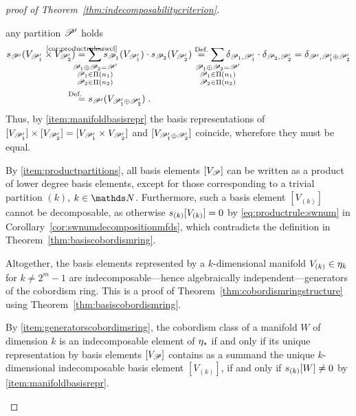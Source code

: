 \begin{proof}[proof of Theorem~\ref{thm:indecomposabilitycriterion}]
\begin{steps}
    any partition $\mathscr{P}'$ holds
    \begin{align*}
      \s{\Part'}(V_{\Part_1'}\times V_{\Part_2'})
      &\cequalsby{\ref{cor:productrule:swcl}}
        \sum_{\mathclap{\substack{
        \Part_1\concat\Part_2=\Part'\\
      \Part_1\in\PartitionsOf{n_1}\\
      \Part_2\in\PartitionsOf{n_2}\\
      }}}
      \s{\Part_1}(V_{\Part_1'}) \cdot \s{\Part_2}(V_{\Part_2'})
      \overset{\text{Def.}}=
      \sum_{\mathclap{\substack{
      \Part_1\concat\Part_2=\Part'\\
      \Part_1\in\PartitionsOf{n_1}\\
      \Part_2\in\PartitionsOf{n_2}\\
      }}}
      \delta_{\Part_1,\Part_1'} \cdot \delta_{\Part_2, \Part_2'}
      = \delta_{\Part', \Part_1'\concat\Part_2'}
      \\
      &\equalsby{Def.} \s{\Part'}(V_{\Part_1'\concat\Part_2'})
        \;.
    \end{align*}
    Thus, by \ref{item:manifoldbasisrepr}
    the basis representations of
    $[V_{\mathscr{P}_1'}]\times[V_{\mathscr{P}_2'}]=[V_{\mathscr{P}_1'}\times V_{\mathscr{P}_2'}]$
    and 
    $[V_{\mathscr{P}_1'\oplus\mathscr{P}_2'}]$
    coincide, wherefore they must be equal. 
  \item\label{item:generatorscobordimsring}
    By \ref{item:productpartitions}, all basis elements
    $[V_{\mathscr{P}}]$ can be written as a product of lower degree basis
    elements, except for those corresponding to a trivial partition
    $(k)$, $k\in\Nat$.
    Furthermore, such a basis element $[V_{(k)}]$ cannot be
    decomposable, as otherwise $s_{(k)}[V_{(k)}] = 0$
    by \autoref{eq:productrule:swnum} in
    Corollary~\ref{cor:swnumdecompositionmfds},
    which contradicts the definition in
    Theorem~\ref{thm:basiscobordismring}.
    
    Altogether, the basis elements represented by a $k$-dimensional
    manifold $V_{(k)}\in\eta_k$ for $k\neq 2^m-1$ are
    indecomposable---hence algebraically independent---generators of
    the cobordism ring.
    This is a proof of Theorem~\ref{thm:cobordismringstructure} using
    Theorem~\ref{thm:basiscobordismring}.
  \item By \ref{item:generatorscobordimsring}, the cobordism
    class of a manifold $W$ of dimension $k$ is an indecomposable
    element of $\eta_*$ if and only if its unique representation by
    basis elements $[V_{\mathscr{P}}]$ contains as a summand the unique
    $k$-dimensional indecomposable basis element $[V_{(k)}]$,
    \idest if and only if $s_{(k)}[W]\neq 0$ by
    \ref{item:manifoldbasisrepr}.
    \qedhere
  \end{steps}
\end{proof}

